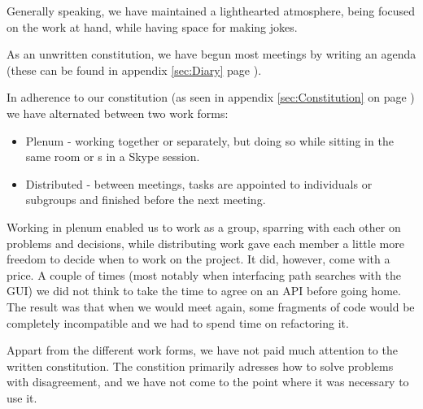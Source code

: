 Generally speaking, we have maintained a lighthearted atmosphere, being focused on the work at hand, while having space for making jokes.

As an unwritten constitution, we have begun most meetings by writing an agenda (these can be found in appendix \ref{sec:Diary} page \pageref{sec:Diary}).

In adherence to our constitution (as seen in appendix \ref{sec:Constitution} on page \pageref{sec:Constitution})
we have alternated between two work forms: 
\begin{itemize}
	\item Plenum - working together or separately, but doing so while sitting in the same room or s in a Skype session.
	\item Distributed - between meetings, tasks are appointed to individuals or subgroups and finished before the next meeting.
\end{itemize}
Working in plenum enabled us to work as a group, sparring with each other on problems and decisions, while distributing work gave each member a little more freedom to decide when to work on the project.
It did, however, come with a price. A couple of times (most notably when interfacing path searches with the GUI) we did not think to take the time to agree on an API before going home. The result was that when we would meet again, some fragments of code would be completely incompatible and we had to spend time on refactoring it.

Appart from the different work forms, we have not paid much attention to the written constitution. The constition primarily adresses how to solve problems with disagreement, and we have not come to the point where it was necessary to use it.
